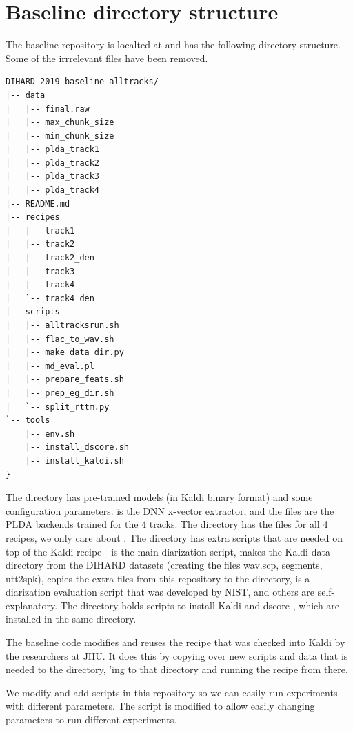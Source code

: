 \section{Baseline directory structure}
The baseline repository is localted at  and has the following directory structure. Some of the irrrelevant files have been removed.

\begin{verbatim}
DIHARD_2019_baseline_alltracks/
|-- data
|   |-- final.raw
|   |-- max_chunk_size
|   |-- min_chunk_size
|   |-- plda_track1
|   |-- plda_track2
|   |-- plda_track3
|   |-- plda_track4
|-- README.md
|-- recipes
|   |-- track1
|   |-- track2
|   |-- track2_den
|   |-- track3
|   |-- track4
|   `-- track4_den
|-- scripts
|   |-- alltracksrun.sh
|   |-- flac_to_wav.sh
|   |-- make_data_dir.py
|   |-- md_eval.pl
|   |-- prepare_feats.sh
|   |-- prep_eg_dir.sh
|   `-- split_rttm.py
`-- tools
    |-- env.sh
    |-- install_dscore.sh
    |-- install_kaldi.sh
}
\end{verbatim}

The  directory has pre-trained models (in Kaldi binary format) and some configuration parameters.  is the DNN x-vector extractor, and the  files are the PLDA backends trained for the 4 tracks. The  directory has the  files for all 4 recipes, we only care about . The  directory has extra scripts that are needed on top of the  Kaldi recipe -  is the main diarization script,  makes the Kaldi data directory from the DIHARD datasets (creating the files wav.scp, segments, utt2spk),  copies the extra files from this repository to the  directory,  \cite{mdeval2006} is a diarization evaluation script that was developed by NIST, and others are self-explanatory. The  directory holds scripts to install Kaldi and dscore \cite{dscore}, which are installed in the same directory.

The baseline code modifies and reuses the  recipe that was checked into Kaldi by the researchers at JHU. It does this by copying over new scripts and data that is needed to the  directory, 'ing to that directory and running the recipe from there.

We modify and add scripts in this repository so we can easily run experiments with different parameters. The  script is modified to allow easily changing parameters to run different experiments.

